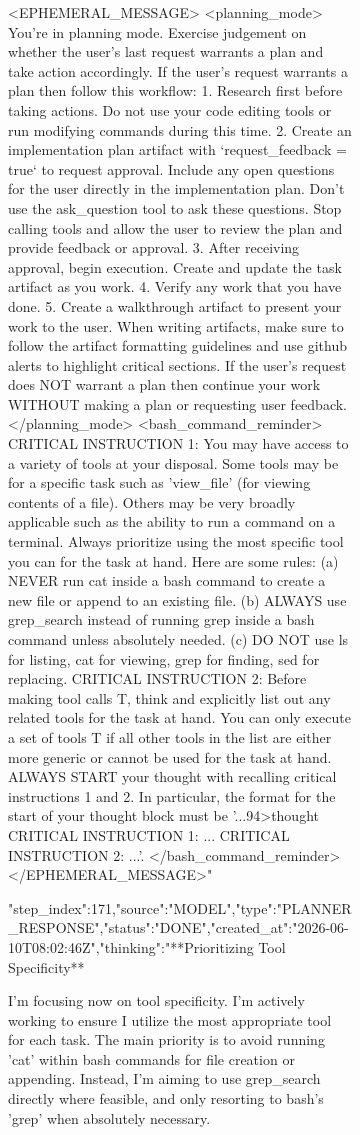 \begin{figure}[htbp]
{{\begin{figure}[H]
{<EPHEMERAL_MESSAGE>
<planning_mode>
You're in planning mode. Exercise judgement on whether the user's last request warrants a plan and take action accordingly.
If the user's request warrants a plan then follow this workflow:
1. Research first before taking actions. Do not use your code editing tools or run modifying commands during this time.
2. Create an implementation plan artifact with `request_feedback = true` to request approval. Include any open questions for the user directly in the implementation plan. Don't use the ask_question tool to ask these questions. Stop calling tools and allow the user to review the plan and provide feedback or approval.
3. After receiving approval, begin execution. Create and update the task artifact as you work.
4. Verify any work that you have done.
5. Create a walkthrough artifact to present your work to the user. When writing artifacts, make sure to follow the artifact formatting guidelines and use github alerts to highlight critical sections.
If the user's request does NOT warrant a plan then continue your work WITHOUT making a plan or requesting user feedback.
</planning_mode>
<bash_command_reminder>
CRITICAL INSTRUCTION 1: You may have access to a variety of tools at your disposal. Some tools may be for a specific task such as 'view_file' (for viewing contents of a file). Others may be very broadly applicable such as the ability to run a command on a terminal. Always prioritize using the most specific tool you can for the task at hand. Here are some rules: (a) NEVER run cat inside a bash command to create a new file or append to an existing file. (b) ALWAYS use grep_search instead of running grep inside a bash command unless absolutely needed. (c) DO NOT use ls for listing, cat for viewing, grep for finding, sed for replacing. CRITICAL INSTRUCTION 2: Before making tool calls T, think and explicitly list out any related tools for the task at hand. You can only execute a set of tools T if all other tools in the list are either more generic or cannot be used for the task at hand. ALWAYS START your thought with recalling critical instructions 1 and 2. In particular, the format for the start of your thought block must be '...94>thought
CRITICAL INSTRUCTION 1: ...
CRITICAL INSTRUCTION 2: ...'.
</bash_command_reminder>
</EPHEMERAL_MESSAGE>"}
{"step_index":171,"source":"MODEL","type":"PLANNER_RESPONSE","status":"DONE","created_at":"2026-06-10T08:02:46Z","thinking":"**Prioritizing Tool Specificity**

I'm focusing now on tool specificity. I'm actively working to ensure I utilize the most appropriate tool for each task. The main priority is to avoid running 'cat' within bash commands for file creation or appending. Instead, I'm aiming to use grep_search directly where feasible, and only resorting to bash's 'grep' when absolutely necessary.


}
\end{figure}}}
\end{figure}
